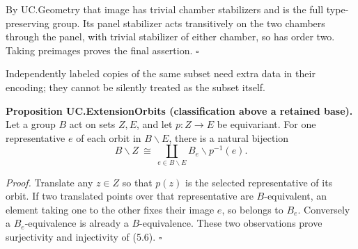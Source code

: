 By UC.Geometry that image has trivial chamber stabilizers and is the
full type-preserving group. Its panel stabilizer acts transitively on
the two chambers through the panel, with trivial stabilizer of either
chamber, so has order two. Taking preimages proves the final assertion.
\(\square\)

Independently labeled copies of the same subset need extra data in their
encoding; they cannot be silently treated as the subset itself.

\textbf{Proposition UC.ExtensionOrbits (classification above a retained
base).} Let a group \(B\) act on sets \(Z,E\), and let \(p:Z\to E\) be
equivariant. For one representative \(e\) of each orbit in
\(B\backslash E\), there is a natural bijection \[
B\backslash Z\ \cong\ \coprod_{e\in B\backslash E}B_e\backslash p^{-1}(e).
\tag{5.6}
\]

\emph{Proof.} Translate any \(z\in Z\) so that \(p(z)\) is the selected
representative of its orbit. If two translated points over that
representative are \(B\)-equivalent, an element taking one to the other
fixes their image \(e\), so belongs to \(B_e\). Conversely a
\(B_e\)-equivalence is already a \(B\)-equivalence. These two
observations prove surjectivity and injectivity of (5.6). \(\square\)
